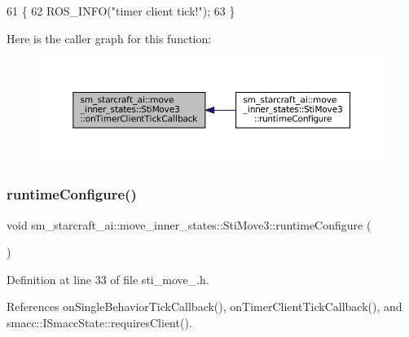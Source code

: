 \begin{DoxyCode}
61   \{
62     ROS\_INFO(\textcolor{stringliteral}{"timer client tick!"});
63   \}
\end{DoxyCode}
Here is the caller graph for this function\+:
\nopagebreak
\begin{figure}[H]
\begin{center}
\leavevmode
\includegraphics[width=350pt]{structsm__starcraft__ai_1_1move__inner__states_1_1StiMove3_aae9ba9faf3d05bfb5353a6569a895b31_icgraph}
\end{center}
\end{figure}
\mbox{\label{structsm__starcraft__ai_1_1move__inner__states_1_1StiMove3_ad32f89ed6e3b623f544aa84760247a21}} 
\subsubsection{\texorpdfstring{runtime\+Configure()}{runtimeConfigure()}}
{\footnotesize\ttfamily void sm\+\_\+starcraft\+\_\+ai\+::move\+\_\+inner\+\_\+states\+::\+Sti\+Move3\+::runtime\+Configure (\begin{DoxyParamCaption}{ }\end{DoxyParamCaption})\hspace{0.3cm}{\ttfamily [inline]}}



Definition at line 33 of file sti\+\_\+move\+\_.\+h.



References on\+Single\+Behavior\+Tick\+Callback(), on\+Timer\+Client\+Tick\+Callback(), and smacc\+::\+I\+Smacc\+State\+::requires\+Client().


